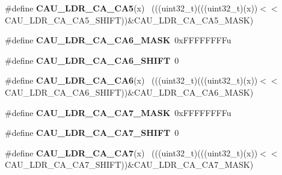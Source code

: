 \begin{DoxyCompactItemize}
\item 
\hypertarget{group___c_a_u___register___masks_ga91a57a4211549a8a89bee85ad91b6866}{}\#define {\bfseries C\+A\+U\+\_\+\+L\+D\+R\+\_\+\+C\+A\+\_\+\+C\+A5}(x)                                            ~(((uint32\+\_\+t)(((uint32\+\_\+t)(x))$<$$<$C\+A\+U\+\_\+\+L\+D\+R\+\_\+\+C\+A\+\_\+\+C\+A5\+\_\+\+S\+H\+I\+F\+T))\&C\+A\+U\+\_\+\+L\+D\+R\+\_\+\+C\+A\+\_\+\+C\+A5\+\_\+\+M\+A\+S\+K)\label{group___c_a_u___register___masks_ga91a57a4211549a8a89bee85ad91b6866}

\item 
\hypertarget{group___c_a_u___register___masks_ga36f44124efda969e60d5366ac7cc7350}{}\#define {\bfseries C\+A\+U\+\_\+\+L\+D\+R\+\_\+\+C\+A\+\_\+\+C\+A6\+\_\+\+M\+A\+S\+K}~0x\+F\+F\+F\+F\+F\+F\+F\+Fu\label{group___c_a_u___register___masks_ga36f44124efda969e60d5366ac7cc7350}

\item 
\hypertarget{group___c_a_u___register___masks_gae0d78056f6ad5c5565d3f767b72335cb}{}\#define {\bfseries C\+A\+U\+\_\+\+L\+D\+R\+\_\+\+C\+A\+\_\+\+C\+A6\+\_\+\+S\+H\+I\+F\+T}~0\label{group___c_a_u___register___masks_gae0d78056f6ad5c5565d3f767b72335cb}

\item 
\hypertarget{group___c_a_u___register___masks_ga99b825aade751eeb0ffdb08ed248291e}{}\#define {\bfseries C\+A\+U\+\_\+\+L\+D\+R\+\_\+\+C\+A\+\_\+\+C\+A6}(x)                                            ~(((uint32\+\_\+t)(((uint32\+\_\+t)(x))$<$$<$C\+A\+U\+\_\+\+L\+D\+R\+\_\+\+C\+A\+\_\+\+C\+A6\+\_\+\+S\+H\+I\+F\+T))\&C\+A\+U\+\_\+\+L\+D\+R\+\_\+\+C\+A\+\_\+\+C\+A6\+\_\+\+M\+A\+S\+K)\label{group___c_a_u___register___masks_ga99b825aade751eeb0ffdb08ed248291e}

\item 
\hypertarget{group___c_a_u___register___masks_ga0aa892e32b2be9b3958706939c94ef3b}{}\#define {\bfseries C\+A\+U\+\_\+\+L\+D\+R\+\_\+\+C\+A\+\_\+\+C\+A7\+\_\+\+M\+A\+S\+K}~0x\+F\+F\+F\+F\+F\+F\+F\+Fu\label{group___c_a_u___register___masks_ga0aa892e32b2be9b3958706939c94ef3b}

\item 
\hypertarget{group___c_a_u___register___masks_ga8630e23e305784aed9a981844b18f468}{}\#define {\bfseries C\+A\+U\+\_\+\+L\+D\+R\+\_\+\+C\+A\+\_\+\+C\+A7\+\_\+\+S\+H\+I\+F\+T}~0\label{group___c_a_u___register___masks_ga8630e23e305784aed9a981844b18f468}

\item 
\hypertarget{group___c_a_u___register___masks_ga3216227d5fd8705fc50b56558635c1ee}{}\#define {\bfseries C\+A\+U\+\_\+\+L\+D\+R\+\_\+\+C\+A\+\_\+\+C\+A7}(x)                                            ~(((uint32\+\_\+t)(((uint32\+\_\+t)(x))$<$$<$C\+A\+U\+\_\+\+L\+D\+R\+\_\+\+C\+A\+\_\+\+C\+A7\+\_\+\+S\+H\+I\+F\+T))\&C\+A\+U\+\_\+\+L\+D\+R\+\_\+\+C\+A\+\_\+\+C\+A7\+\_\+\+M\+A\+S\+K)\label{group___c_a_u___register___masks_ga3216227d5fd8705fc50b56558635c1ee}


\end{DoxyCompactItemize}
